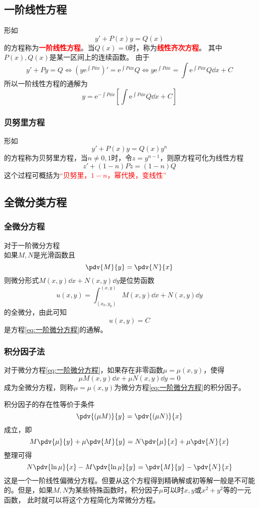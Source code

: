 \subsection{一阶线性方程}
形如\[ y' + P(x)y = Q(x) \]的方程称为\textcolor{red}{\textbf{\textsf{一阶线性方程}}}。当$Q(x)=0$时，称为\textcolor{red}{\textbf{\textsf{线性齐次方程}}}。
其中$P(x),Q(x)$是某一区间上的连续函数。
由于
\[ y' + Py = Q \iff (y\mathrm{e}^{\int P\dd{x}})' = \mathrm{e}^{\int P\dd{x}}Q \iff y\mathrm{e}^{\int P\dd{x}} = \int \mathrm{e}^{\int P\dd{x}}Q\dd{x} + C \]
所以一阶线性方程的通解为
\[ y = \mathrm{e}^{-\int P\dd{x}}\left[\int \mathrm{e}^{\int P\dd{x}}Q \dd{x} +C \right] \]
\subsubsection{贝努里方程}
形如
\[ y' + P(x)y = Q(x)y^n \]
的方程称为贝努里方程，当$n\neq 0,1$时，令$z=y^{n-1}$，则原方程可化为线性方程
\[ z' + (1-n)Pz = (1-n)Q \]
这个过程可概括为\textcolor{red}{“贝努里，$1-n$，幂代换，变线性”}

\subsection{全微分类方程}
\subsubsection{全微分方程}
对于一阶微分方程
\begin{equation}
    \label{eq:一阶微分方程}
\end{equation}
如果$M,N$是光滑函数且
\[ \pdv{M}{y} = \pdv{N}{x} \]
则微分形式$M(x,y)\dd{x} + N(x,y)\dd{y}$是位势函数
\[ u(x,y) = \int_{(x_0,y_0)}^{(x,y)} M(x,y)\dd{x} + N(x,y)\dd{y} \]
的全微分，由此可知
\[ u(x,y) = C \]
是方程\ref{eq:一阶微分方程}的通解。

\subsubsection{积分因子法}
对于微分方程\ref{eq:一阶微分方程}，如果存在非零函数$\mu=\mu(x,y)$，使得
\[ \mu M(x,y)\dd{x} + \mu N(x,y)\dd{y} = 0 \]
成为全微分方程，则称$\mu=\mu(x,y)$为微分方程\ref{eq:一阶微分方程}的积分因子。

积分因子的存在性等价于条件
\[ \pdv{(\mu M)}{y} = \pdv{(\mu N)}{x} \]
成立，即
\[ M\pdv{\mu}{y} + \mu\pdv{M}{y} = N\pdv{\mu}{x} + \mu\pdv{N}{x} \]
整理可得
\begin{equation}
    \label{eq:积分因子法}
    N\pdv{\ln\mu}{x} - M\pdv{\ln\mu}{y} = \pdv{M}{y} - \pdv{N}{x}
\end{equation}
这是一个一阶线性偏微分方程。但要从这个方程得到精确解或初等解一般是不可能的。但是，如果$M,N$为某些特殊函数时，积分因子$\mu$可以时$x,y$或$x^2+y^2$等的一元函数，
此时就可以将这个方程简化为常微分方程。

